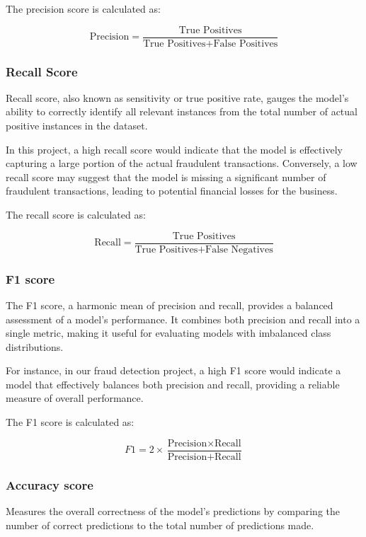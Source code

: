 \documentclass[conference]{IEEEtran}
\begin{document}
The precision score is calculated as:

\[ \text{Precision} = \frac{\text{True Positives}}{\text{True Positives} + \text{False Positives}} \]

\subsubsection{Recall Score}

Recall score, also known as sensitivity or true positive rate, gauges the model's ability to correctly identify all relevant instances from the total number of actual positive instances in the dataset.

In this project, a high recall score would indicate that the model is effectively capturing a large portion of the actual fraudulent transactions. Conversely, a low recall score may suggest that the model is missing a significant number of fraudulent transactions, leading to potential financial losses for the business.

The recall score is calculated as:

\[ \text{Recall} = \frac{\text{True Positives}}{\text{True Positives} + \text{False Negatives}} \]

\subsubsection{F1 score}

The F1 score, a harmonic mean of precision and recall, provides a balanced assessment of a model's performance. It combines both precision and recall into a single metric, making it useful for evaluating models with imbalanced class distributions.

For instance, in our fraud detection project, a high F1 score would indicate a model that effectively balances both precision and recall, providing a reliable measure of overall performance.

The F1 score is calculated as:

\[ F1 = 2 \times \frac{\text{Precision} \times \text{Recall}}{\text{Precision} + \text{Recall}} \]

\subsubsection{Accuracy score}

Measures the overall correctness of the model's predictions by comparing the number of correct predictions to the total number of predictions made.
\end{document}
